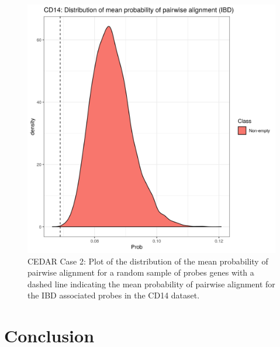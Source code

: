 \documentclass[14pt]{extarticle} %
\begin{document}
	\begin{figure}[h]
		\centering
		\includegraphics[scale=0.75]{Images/Biology_data/Set_1000/All_datasets//Mean_alignment_probability/CD14_KEGG_INFLAMMATORY_BOWEL_DISEASE.png}
		\caption{CEDAR Case 2: Plot of the distribution of the mean probability of pairwise alignment for a random sample of probes genes with a dashed line indicating the mean probability of pairwise alignment for the IBD associated probes in the CD14 dataset.}
		\label{fig:results:cedar_2:mdi_cd14_ibd_alignment_prob_distn}
	\end{figure}
	
	\section{Conclusion}
	
\end{document}
